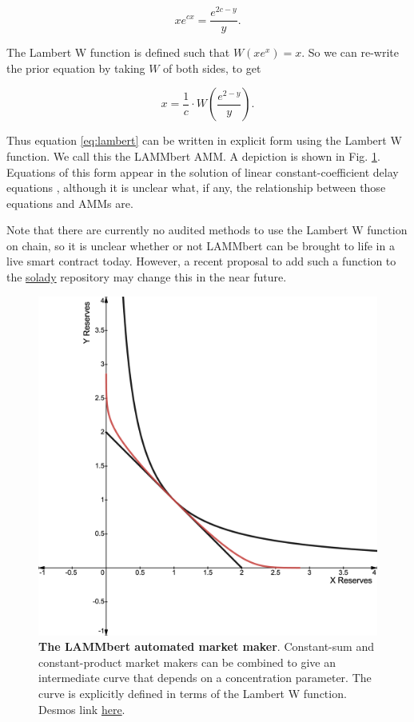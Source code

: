 \documentclass[bibliography=numbered]{article}
\begin{document}
\begin{equation}
\label{eq:lambert}
    xe^{cx}
    = 
    \frac{e^{2c-y}}{y}.
\end{equation}

The Lambert W function is defined such that $W(xe^x) = x$. So we can re-write the prior equation by taking $W$ of both sides, to get

\begin{equation}
\label{eq:lambert-2}
    x
    = 
    \frac{1}{c} \cdot W\left( \frac{e^{2-y}}{y} \right).
\end{equation}

Thus equation \eqref{eq:lambert} can be written in explicit form using the Lambert W function. We call this the LAMMbert AMM. A depiction is shown in Fig. \ref{fig:lambertw}. Equations of this form appear in the solution of linear constant-coefficient delay equations \cite{corless1996lambert}, although it is unclear what, if any, the relationship between those equations and AMMs are. 

Note that there are currently no audited methods to use the Lambert W function on chain, so it is unclear whether or not LAMMbert can be brought to life in a live smart contract today. However, a recent proposal to add such a function to the \href{https://github.com/Vectorized/solady/pull/706}{solady} repository may change this in the near future.

\begin{figure}
    \centering
    \includegraphics[width=0.5\linewidth]{lambertw.png}
    \caption{\textbf{The LAMMbert automated market maker}. Constant-sum and constant-product market makers can be combined to give an intermediate curve that depends on a concentration parameter. The curve is explicitly defined in terms of the Lambert W function. Desmos link \href{https://www.desmos.com/calculator/uvlxqb1hyz}{here}.}
    \label{fig:lambertw}
\end{figure}

\printbibliography %
\end{document}
